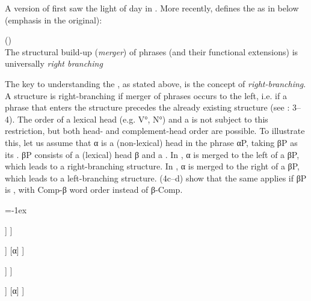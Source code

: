 \documentclass[output=paper, colorlinks, citecolor=brown]{langscibook}
\begin{document}
A version of  first saw the light of day in \citet{Haider1992}. More recently, \citet[3]{Haider2013} defines the  as in  below (emphasis in the original):

\ea
\label{ex:sangfelt:3}
 ()\\
The structural build-up (\textit{merger}) of phrases (and their functional extensions) is 
universally \textit{right branching}
\z 


The key to understanding the , as stated above, is the concept of \textit{right-branching}. A structure is right-branching if merger of phrases occurs to the left, i.e. if a phrase that enters the structure precedes the already existing structure (see \citealt{Haider2013}: 3–4). The order of a lexical head (e.g. V°, N°) and a  is not subject to this restriction, but both head- and complement-head order are possible. To illustrate this, let us assume that α is a (non-lexical) head in the phrase αP, taking βP as its . βP consists of a (lexical) head β and a . In , α is merged to the left of a  βP, which leads to a right-branching structure. In , α is merged to the right of a  βP, which leads to a left-branching structure. (4c–d) show that the same applies if βP is , with Comp-β word order instead of β{}-Comp.


\ea
\label{ex:sangfelt:4} 
\columnsep=-1ex
\begin{multicols}{4}
\ea \label{ex:sangfelt:4a}
\begin{forest}
	[αP
		 [α]
		  [βP 
		  	 [β] 
		  	 [Comp]
  	 	 ]
	 ]
\end{forest}

\ex\label{ex:sangfelt:4b} 
\begin{forest}
	[αP 
		[βP 
			[β] 
			[Comp]
			]
		[α] 
	]	
\end{forest}

\ex \label{ex:sangfelt:4c} 
\begin{forest}
	[αP
		[α]
		[βP
			[Comp] 
			[β]
		]
	]
\end{forest}

\ex \label{ex:sangfelt:4d} 
\begin{forest}
		[αP
			[βP
				[Comp]
				[β]
			]
			[α]
		]
\end{forest}

\z 
\end{multicols}
\z
\end{document}

